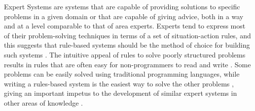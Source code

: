 
Expert Systems are systems that are capable of providing solutions to specific problems in a given domain or that are capable of giving advice, both in a way and at a level comparable to that of \cite{lucas1991} area experts. Experts tend to express most of their problem-solving techniques in terms of a set of situation-action rules, and this suggests that rule-based systems should be the method of choice for building such systems \cite{hayesRoth1985}. The intuitive appeal of rules to solve poorly structured problems results in rules that are often easy for non-programmers to read and write \cite{grossner1993}. Some problems can be easily solved using traditional programming languages, while writing a rules-based system is the easiest way to solve the other problems \cite{friedman2003}, giving an important impetus to the development of similar expert systems in other areas of knowledge \cite{lucas1991}.


